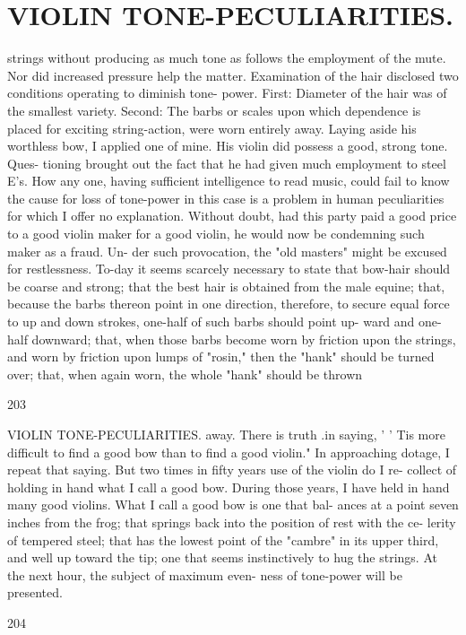 \documentclass{article}
\begin{document}
\section*{VIOLIN TONE-PECULIARITIES.}
strings without producing as much tone as follows the employment of the mute. Nor did increased pressure help the matter. Examination of the hair disclosed two conditions operating to diminish tone- power. First: Diameter of the hair was of the smallest variety. Second: The barbs or scales upon which dependence is placed for exciting string-action, were worn entirely away. Laying aside his worthless bow, I applied one of mine. His violin did possess a good, strong tone. Ques- tioning brought out the fact that he had given much employment to steel E's. How any one, having sufficient intelligence to read music, could fail to know the cause for loss of tone-power in this case is a problem in human peculiarities for which I offer no explanation. Without doubt, had this party paid a good price to a good violin maker for a good violin, he would now be condemning such maker as a fraud. Un- der such provocation, the "old masters" might be excused for restlessness. To-day it seems scarcely necessary to state that bow-hair should be coarse and strong; that the best hair is obtained from the male equine; that, because the barbs thereon point in one direction, therefore, to secure equal force to up and down strokes, one-half of such barbs should point up- ward and one-half downward; that, when those barbs become worn by friction upon the strings, and worn by friction upon lumps of "rosin," then the "hank" should be turned over; that, when again worn, the whole "hank" should be thrown

203

VIOLIN TONE-PECULIARITIES. away. There is truth .in saying, ' ' Tis more difficult to find a good bow than to find a good violin." In approaching dotage, I repeat that saying. But two times in fifty years use of the violin do I re- collect of holding in hand what I call a good bow. During those years, I have held in hand many good violins. What I call a good bow is one that bal- ances at a point seven inches from the frog; that springs back into the position of rest with the ce- lerity of tempered steel; that has the lowest point of the "cambre" in its upper third, and well up toward the tip; one that seems instinctively to hug the strings. At the next hour, the subject of maximum even- ness of tone-power will be presented.

204
\end{document}
